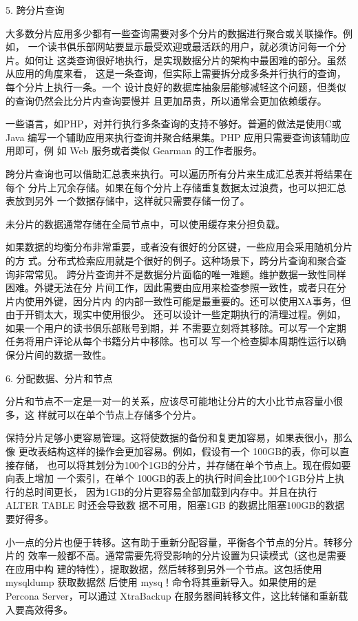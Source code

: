 5. 跨分片查询

大多数分片应用多少都有一些查询需要对多个分片的数据进行聚合或关联操作。例如，
一个读书俱乐部网站要显示最受欢迎或最活跃的用户，就必须访问每一个分片。如何让
这类查询很好地执行，是实现数据分片的架构中最困难的部分。虽然从应用的角度来看，
这是一条查询，但实际上需要拆分成多条并行执行的查询，每个分片上执行一条。一个
设计良好的数据库抽象层能够减轻这个问题，但类似的查询仍然会比分片内查询要慢并
且更加昂贵，所以通常会更加依赖缓存。

一些语言，如PHP，对并行执行多条查询的支持不够好。普遍的做法是使用C或Java
编写一个辅助应用来执行查询并聚合结果集。PHP 应用只需要查询该辅助应用即可，例
如 Web 服务或者类似 Gearman 的工作者服务。

跨分片查询也可以借助汇总表来执行。可以遍历所有分片来生成汇总表并将结果在每个
分片上冗余存储。如果在每个分片上存储重复数据太过浪费，也可以把汇总表放到另外
一个数据存储中，这样就只需要存储一份了。

未分片的数据通常存储在全局节点中，可以使用缓存来分担负载。

如果数据的均衡分布非常重要，或者没有很好的分区键，一些应用会采用随机分片的方
式。分布式检索应用就是个很好的例子。这种场景下，跨分片查询和聚合查询非常常见。
跨分片查询并不是数据分片面临的唯一难题。维护数据一致性同样困难。外键无法在分
片间工作，因此需要由应用来检查参照一致性，或者只在分片内使用外键，因分片内
的内部一致性可能是最重要的。还可以使用XA事务，但由于开销太大，现实中使用很少。
还可以设计一些定期执行的清理过程。例如，如果一个用户的读书俱乐部账号到期，并
不需要立刻将其移除。可以写一个定期任务将用户评论从每个书籍分片中移除。也可以
写一个检查脚本周期性运行以确保分片间的数据一致性。

6. 分配数据、分片和节点

分片和节点不一定是一对一的关系，应该尽可能地让分片的大小比节点容量小很多，这
样就可以在单个节点上存储多个分片。

保持分片足够小更容易管理。这将使数据的备份和复更加容易，如果表很小，那么像
更改表结构这样的操作会更加容易。例如，假设有一个 100GB的表，你可以直接存储，
也可以将其划分为100个1GB的分片，并存储在单个节点上。现在假如要向表上增加
一个索引，在单个 100GB的表上的执行时间会比100个1GB分片上执行的总时间更长，
因为1GB的分片更容易全部加载到内存中。并且在执行 ALTER TABLE 时还会导致数
据不可用，阻塞1GB 的数据比阻塞100GB的数据要好得多。

小一点的分片也便于转移。这有助于重新分配容量，平衡各个节点的分片。转移分片的
效率一般都不高。通常需要先将受影响的分片设置为只读模式（这也是需要在应用中构
建的特性），提取数据，然后转移到另外一个节点。这包括使用mysqldump 获取数据然
后使用 mysq！命令将其重新导入。如果使用的是 Percona Server，可以通过 XtraBackup
在服务器间转移文件，这比转储和重新载入要高效得多。

